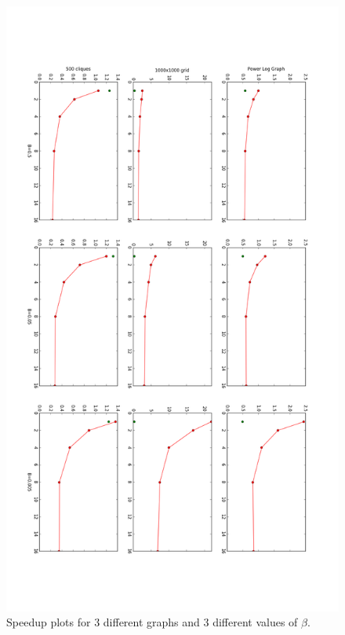 \documentclass[11pt]{scrartcl}
\theoremstyle{plain}
\theoremstyle{definition}
\theoremstyle{remark}
\begin{document}
\begin{figure}
\vspace*{-3cm}\includegraphics[width=\textwidth]{Speedup_plots.png}\vspace{-3cm}
\caption{Speedup plots for 3 different graphs and 3 different values of $\beta$.}
\label{fig:2}
\end{figure}
\end{document}
